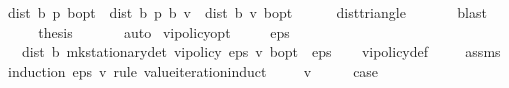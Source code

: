 \begin{isabellebody}
\ {\isachardoublequoteopen}dist\ {\isacharparenleft}{\kern0pt}{\isasymnu}\isactrlsub b\ {\isacharquery}{\kern0pt}p{\isacharparenright}{\kern0pt}\ {\isasymnu}\isactrlsub b{\isacharunderscore}{\kern0pt}opt\ {\isasymle}\ dist\ {\isacharparenleft}{\kern0pt}{\isasymnu}\isactrlsub b\ {\isacharquery}{\kern0pt}p{\isacharparenright}{\kern0pt}\ {\isacharparenleft}{\kern0pt}{\isasymL}\isactrlsub b\ v{\isacharparenright}{\kern0pt}\ {\isacharplus}{\kern0pt}\ dist\ {\isacharparenleft}{\kern0pt}{\isasymL}\isactrlsub b\ v{\isacharparenright}{\kern0pt}\ {\isasymnu}\isactrlsub b{\isacharunderscore}{\kern0pt}opt{\isachardoublequoteclose}\isanewline
\ \ \ \ \isamarkupfalse%
\ dist{\isacharunderscore}{\kern0pt}triangle\ \isanewline
\ \ \ \ \isamarkupfalse%
\ blast\ \ \isanewline
\ \ \isamarkupfalse%
\ \isamarkupfalse%
\ {\isacharquery}{\kern0pt}thesis\ \isanewline
\ \ \ \ \isamarkupfalse%
\ auto\isanewline
{}\isamarkupfalse%
%
\endisatagproof
{\isafoldproof}%
%
\isadelimproof
\isanewline
%
\endisadelimproof
\isanewline
{}\isamarkupfalse%
\ vi{\isacharunderscore}{\kern0pt}policy{\isacharunderscore}{\kern0pt}opt{\isacharcolon}{\kern0pt}\isanewline
\ \ \ {\isachardoublequoteopen}{}\ {\isacharless}{\kern0pt}\ eps{\isachardoublequoteclose}\isanewline
\ \ \ {\isachardoublequoteopen}dist\ {\isacharparenleft}{\kern0pt}{\isasymnu}\isactrlsub b\ {\isacharparenleft}{\kern0pt}mk{\isacharunderscore}{\kern0pt}stationary{\isacharunderscore}{\kern0pt}det\ {\isacharparenleft}{\kern0pt}vi{\isacharunderscore}{\kern0pt}policy\ eps\ v{\isacharparenright}{\kern0pt}{\isacharparenright}{\kern0pt}{\isacharparenright}{\kern0pt}\ {\isasymnu}\isactrlsub b{\isacharunderscore}{\kern0pt}opt\ {\isacharless}{\kern0pt}\ eps{\isachardoublequoteclose}\isanewline
%
\isadelimproof
\ \ %
\endisadelimproof
%
\isatagproof
{}\isamarkupfalse%
\ vi{\isacharunderscore}{\kern0pt}policy{\isacharunderscore}{\kern0pt}def\ \isanewline
\ \ \isamarkupfalse%
\ assms\isanewline
{}\isamarkupfalse%
\ {\isacharparenleft}{\kern0pt}induction\ eps\ v\ rule{\isacharcolon}{\kern0pt}\ value{\isacharunderscore}{\kern0pt}iteration{\isachardot}{\kern0pt}induct{\isacharparenright}{\kern0pt}\isanewline
\ \ \isamarkupfalse%
\ {\isacharparenleft}{\kern0pt}{}\ v{\isacharparenright}{\kern0pt}\isanewline
\ \ \isamarkupfalse%
\ \isamarkupfalse%
\ {\isacharquery}{\kern0pt}case\isanewline

\end{isabellebody}
